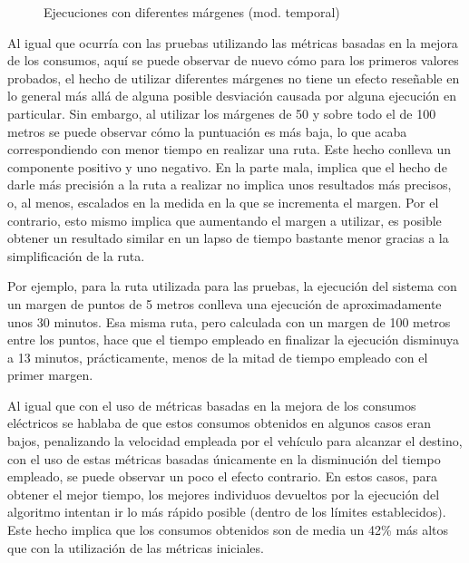\documentclass[11pt,spanish,listoffigures,listoftables]{tfgetsinf}
\makeatletter
\def\addlegendentry{\csname pgfplots@addlegendentry\endcsname}
\makeatother
\begin{document}
\begin{figure}[!htb]
    \caption{Ejecuciones con diferentes márgenes (mod. temporal)}
    \label{fig:adv_multi_margin_time}
\end{figure}

Al igual que ocurría con las pruebas utilizando las métricas basadas en la mejora de los consumos, aquí se puede observar de nuevo cómo para los primeros valores probados, el hecho de utilizar diferentes márgenes no tiene un efecto reseñable en lo general más allá de alguna posible desviación causada por alguna ejecución en particular. Sin embargo, al utilizar los márgenes de 50 y sobre todo el de 100 metros se puede observar cómo la puntuación es más baja, lo que acaba correspondiendo con menor tiempo en realizar una ruta. Este hecho conlleva un componente positivo y uno negativo. En la parte mala, implica que el hecho de darle más precisión a la ruta a realizar no implica unos resultados más precisos, o, al menos, escalados en la medida en la que se incrementa el margen. Por el contrario, esto mismo implica que aumentando el margen a utilizar, es posible obtener un resultado similar en un lapso de tiempo bastante menor gracias a la simplificación de la ruta.

Por ejemplo, para la ruta utilizada para las pruebas, la ejecución del sistema con un margen de puntos de 5 metros conlleva una ejecución de aproximadamente unos 30 minutos. Esa misma ruta, pero calculada con un margen de 100 metros entre los puntos, hace que el tiempo empleado en finalizar la ejecución disminuya a 13 minutos, prácticamente, menos de la mitad de tiempo empleado con el primer margen.

Al igual que con el uso de métricas basadas en la mejora de los consumos eléctricos se hablaba de que estos consumos obtenidos en algunos casos eran bajos, penalizando la velocidad empleada por el vehículo para alcanzar el destino, con el uso de estas métricas basadas únicamente en la disminución del tiempo empleado, se puede observar un poco el efecto contrario. En estos casos, para obtener el mejor tiempo, los mejores individuos devueltos por la ejecución del algoritmo intentan ir lo más rápido posible (dentro de los límites establecidos). Este hecho implica que los consumos obtenidos son de media un 42\% más altos que con la utilización de las métricas iniciales.
\end{document}
